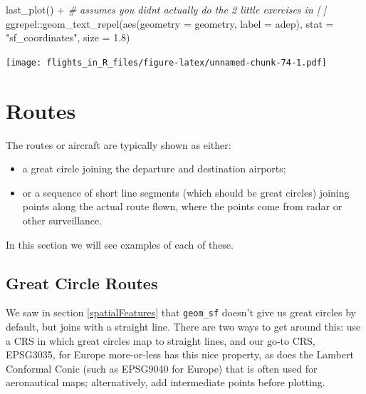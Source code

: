 \documentclass[
]{book}
\newenvironment{Shaded}{\begin{snugshade}}{\end{snugshade}}
\newcommand{\AttributeTok}[1]{\textcolor[rgb]{0.77,0.63,0.00}{#1}}
\newcommand{\CommentTok}[1]{\textcolor[rgb]{0.56,0.35,0.01}{\textit{#1}}}
\newcommand{\FloatTok}[1]{\textcolor[rgb]{0.00,0.00,0.81}{#1}}
\newcommand{\FunctionTok}[1]{\textcolor[rgb]{0.00,0.00,0.00}{#1}}
\newcommand{\NormalTok}[1]{#1}
\newcommand{\SpecialCharTok}[1]{\textcolor[rgb]{0.00,0.00,0.00}{#1}}
\newcommand{\StringTok}[1]{\textcolor[rgb]{0.31,0.60,0.02}{#1}}
\providecommand{\tightlist}{%
  \setlength{\itemsep}{0pt}\setlength{\parskip}{0pt}}
\begin{document}
\begin{Shaded}
\begin{Highlighting}[]
\FunctionTok{last\_plot}\NormalTok{() }\SpecialCharTok{+} \CommentTok{\# assumes you didn\textquotesingle{}t actually do the 2 little exercises in [ ]}
\NormalTok{  ggrepel}\SpecialCharTok{::}\FunctionTok{geom\_text\_repel}\NormalTok{(}\FunctionTok{aes}\NormalTok{(}\AttributeTok{geometry =}\NormalTok{ geometry, }\AttributeTok{label =}\NormalTok{ adep), }
                           \AttributeTok{stat =} \StringTok{"sf\_coordinates"}\NormalTok{,}
                           \AttributeTok{size =} \FloatTok{1.8}\NormalTok{) }
\end{Highlighting}
\end{Shaded}

\texttt{[image: flights\_in\_R\_files/figure-latex/unnamed-chunk-74-1.pdf]}

\hypertarget{mapRoutes}{%
\section{Routes}\label{mapRoutes}}

The routes or aircraft are typically shown as either:

\begin{itemize}
\tightlist
\item
  a great circle joining the departure and destination airports;
\item
  or a sequence of short line segments (which should be great circles) joining points along the actual route flown, where the points come from radar or other surveillance.
\end{itemize}

In this section we will see examples of each of these.

\hypertarget{great-circle-routes}{%
\subsection{Great Circle Routes}\label{great-circle-routes}}

We saw in section \ref{spatialFeatures} that \texttt{geom\_sf} doesn't give us great circles by default, but joins with a straight line. There are two ways to get around this: use a CRS in which great circles map to straight lines, and our go-to CRS, EPSG3035, for Europe more-or-less has this nice property, as does the Lambert Conformal Conic (such as EPSG9040 for Europe) that is often used for aeronautical maps; alternatively, add intermediate points before plotting.
\end{document}
